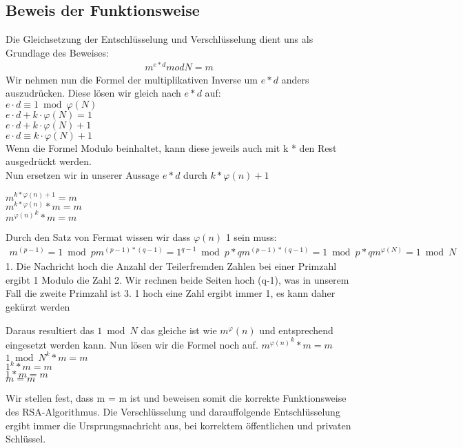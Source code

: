 \subsection{Beweis der Funktionsweise}
Die Gleichsetzung der Entschlüsselung und Verschlüsselung dient uns als Grundlage des Beweises:
\begin{align}   
 m^{e*d} mod N = m
\end{align}
%
Wir nehmen nun die Formel der multiplikativen Inverse um $ e*d $ anders auszudrücken. Diese lösen wir gleich nach $ e*d $ auf:\\
$ e \cdot d \equiv 1 \bmod{\varphi(N)} $ \\
$ e \cdot d + k \cdot \varphi(N) = 1 $ \\
$ e \cdot d + k \cdot \varphi(N) + 1 $ \\
$ e \cdot d \equiv k \cdot \varphi(N)+1 $ \\
Wenn die Formel Modulo beinhaltet, kann diese jeweils auch mit k * den Rest ausgedrückt werden. \\
%
Nun ersetzen wir in unserer Aussage $ e*d $ durch $ k* \varphi(n)+1 $
\begin{center}
$ m^{ k* \varphi(n) + 1} = m $ \\
$ m^{k* \varphi(n)} * m = m $ \\
$ { m^{ \varphi(n) }} ^k * m = m $ \\
\end{center}
%
Durch den Satz von Fermat wissen wir dass $ \varphi(n) $ 1 sein muss:
\begin{align}
  m^{(p-1)} = 1 \bmod p
  m^{(p-1)*(q-1)} = 1^{q-1} \bmod p*q
  m^{(p-1)*(q-1)} = 1 \bmod p*q
  m^{\varphi(N)} = 1 \bmod N
\end{align}
1. Die Nachricht hoch die Anzahl der Teilerfremden Zahlen bei einer Primzahl ergibt 1 Modulo die Zahl
2. Wir rechnen beide Seiten hoch (q-1), was in unserem Fall die zweite Primzahl ist %
3. 1 hoch eine Zahl ergibt immer 1, es kann daher gekürzt werden

Daraus resultiert das $ 1 \bmod N $ das gleiche ist wie $ m^\varphi(n) $ und entsprechend eingesetzt werden kann. Nun lösen wir die Formel noch auf. 
$ { m^{ \varphi(n) }} ^k * m = m $ \\
$ {1 \bmod N }^k * m = m $ \\
$ 1^k * m = m $ \\
$ 1 * m = m $ \\
$ m = m $

Wir stellen fest, dass m = m ist und beweisen somit die korrekte Funktionsweise des RSA-Algorithmus. Die Verschlüsselung und darauffolgende Entschlüsselung ergibt immer die Ursprungsnachricht aus, bei korrektem öffentlichen und privaten Schlüssel.

